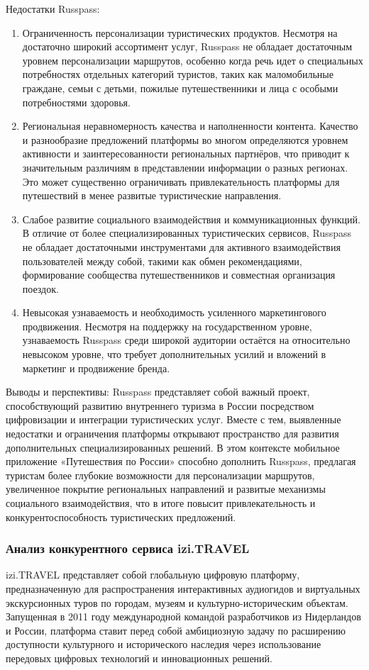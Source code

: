Недостатки Russpass:
\begin{enumerate}
    \item Ограниченность персонализации туристических продуктов. Несмотря на достаточно широкий ассортимент услуг, Russpass не обладает достаточным уровнем персонализации маршрутов, особенно когда речь идет о специальных потребностях отдельных категорий туристов, таких как маломобильные граждане, семьи с детьми, пожилые путешественники и лица с особыми потребностями здоровья.
    \item Региональная неравномерность качества и наполненности контента. Качество и разнообразие предложений платформы во многом определяются уровнем активности и заинтересованности региональных партнёров, что приводит к значительным различиям в представлении информации о разных регионах. Это может существенно ограничивать привлекательность платформы для путешествий в менее развитые туристические направления.
    \item Слабое развитие социального взаимодействия и коммуникационных функций. В отличие от более специализированных туристических сервисов, Russpass не обладает достаточными инструментами для активного взаимодействия пользователей между собой, такими как обмен рекомендациями, формирование сообщества путешественников и совместная организация поездок.
    \item Невысокая узнаваемость и необходимость усиленного маркетингового продвижения. Несмотря на поддержку на государственном уровне, узнаваемость Russpass среди широкой аудитории остаётся на относительно невысоком уровне, что требует дополнительных усилий и вложений в маркетинг и продвижение бренда.
\end{enumerate}

Выводы и перспективы:
Russpass представляет собой важный проект, способствующий развитию внутреннего туризма в России посредством цифровизации и интеграции туристических услуг. Вместе с тем, выявленные недостатки и ограничения платформы открывают пространство для развития дополнительных специализированных решений. В этом контексте мобильное приложение «Путешествия по России» способно дополнить Russpass, предлагая туристам более глубокие возможности для персонализации маршрутов, увеличенное покрытие региональных направлений и развитые механизмы социального взаимодействия, что в итоге повысит привлекательность и конкурентоспособность туристических предложений.

\subsubsection*{Анализ конкурентного сервиса izi.TRAVEL}
izi.TRAVEL представляет собой глобальную цифровую платформу, предназначенную для распространения интерактивных аудиогидов и виртуальных экскурсионных туров по городам, музеям и культурно-историческим объектам. Запущенная в 2011 году международной командой разработчиков из Нидерландов и России, платформа ставит перед собой амбициозную задачу по расширению доступности культурного и исторического наследия через использование передовых цифровых технологий и инновационных решений.

